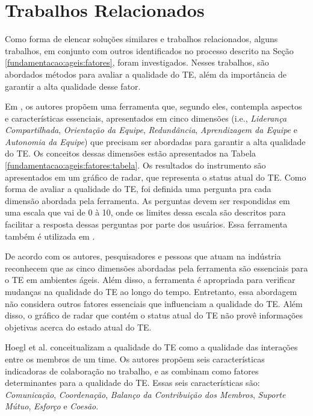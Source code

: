 \chapter{Trabalhos Relacionados}
\label{trabalhos}

Como forma de elencar soluções similares e trabalhos relacionados, alguns trabalhos, em conjunto com outros identificados no processo descrito na Seção \ref{fundamentacao:ageis:fatores}, foram investigados. Nesses trabalhos, são abordados métodos para avaliar a qualidade do TE, além da importância de garantir a alta qualidade desse fator.

Em \cite{moe}, os autores propõem uma ferramenta que, segundo eles, contempla aspectos e características essenciais, apresentados em cinco dimensões (i.e., \textit{Liderança Compartilhada}, \textit{Orientação da Equipe}, \textit{Redundância}, \textit{Aprendizagem da Equipe} e \textit{Autonomia da Equipe}) que precisam ser abordadas para garantir a alta qualidade do TE. Os conceitos dessas dimensões estão apresentados na Tabela \ref{fundamentacao:ageis:fatores:tabela}. Os resultados do instrumento são apresentados em um gráfico de radar, que representa o status atual do TE. Como forma de avaliar a qualidade do TE, foi definida uma pergunta pra cada dimensão abordada pela ferramenta. As perguntas devem ser respondidas em uma escala que vai de 0 à 10, onde os limites dessa escala são descritos para facilitar a resposta dessas perguntas por parte dos usuários. Essa ferramenta também é utilizada em \cite{ringstad}.

De acordo com os autores, pesquisadores e pessoas que atuam na indústria reconhecem que as cinco dimensões abordadas pela ferramenta são essenciais para o TE em ambientes ágeis. Além disso, a ferramenta é apropriada para verificar mudanças na qualidade do TE ao longo do tempo. Entretanto, essa abordagem não considera outros fatores essenciais que influenciam a qualidade do TE. Além disso, o gráfico de radar que contém o status atual do TE não provê informações objetivas acerca do estado atual do TE.

Hoegl et al. \cite{hoegl} conceitualizam a qualidade do TE como a qualidade das interações entre os membros de um time. Os autores propõem seis características indicadoras de colaboração no trabalho, e as combinam como fatores determinantes para a qualidade do TE. Essas seis características são: \textit{Comunicação}, \textit{Coordenação}, \textit{Balanço da Contribuição dos Membros}, \textit{Suporte Mútuo}, \textit{Esforço} e \textit{Coesão}.

